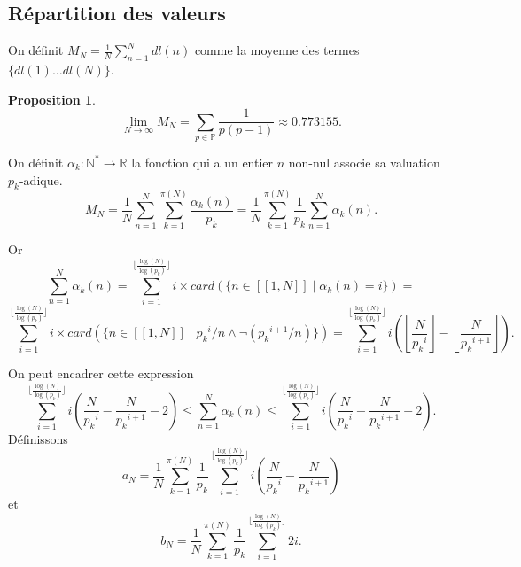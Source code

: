 \documentclass[a4paper, 12pt]{article}
\newcommand{\N}{\mathbb{N}}
\newcommand{\R}{\mathbb{R}}
\newcommand{\Pm}{\mathbb{P}}
\newcommand{\Prv}{\noindent{\it Preuve. }}
\newtheorem{prop}{Proposition}
\begin{document}

\subsection{Répartition des valeurs}

On définit $M_N = \frac{1}{N} \sum_{n=1}^{N} dl(n)$ comme la moyenne des termes $\{dl(1) \dots dl(N)\}$.

\begin{prop} \label{prop10} \begin{equation} \label{eq10}
\lim_{N \to \infty} M_N = \sum_{p \in \Pm}^{} \frac{1}{p(p-1)} \approx 0.773155. \end{equation} \end{prop}

\Prv
On définit $\alpha_k : \N^{*} \longrightarrow \R$ la fonction qui a un entier $n$ non-nul associe sa valuation $p_k$-adique.
\[M_N = \frac{1}{N} \sum_{n=1}^{N} \sum_{k=1}^{\pi(N)} \frac{\alpha_k(n)}{p_k} = \frac{1}{N} \sum_{k=1}^{\pi(N)} \frac{1}{p_k} \sum_{n=1}^{N} \alpha_k(n). \]

Or \[ \sum_{n=1}^{N} \alpha_k(n) =  \sum_{i=1}^{\lfloor \frac{\log(N)}{\log(p_k)} \rfloor} i \times card(\{n \in [\![1, N]\!] \mid \alpha_k(n)=i\}) = \]
\[ \sum_{i=1}^{\lfloor \frac{\log(N)}{\log(p_k)} \rfloor} i \times card(\{n \in [\![1, N]\!] \mid {p_k}^i / n \land \lnot({p_k}^{i+1} / n)\}) = \sum_{i=1}^{\lfloor \frac{\log(N)}{\log(p_k)} \rfloor} i \left(\left\lfloor \frac{N}{{p_k}^i} \right\rfloor - \left\lfloor \frac{N}{{p_k}^{i+1}} \right\rfloor \right).\]

On peut encadrer cette expression
\[\sum_{i=1}^{\lfloor \frac{\log(N)}{\log(p_k)} \rfloor} i \left(\frac{N}{{p_k}^i} -  \frac{N}{{p_k}^{i+1}} - 2 \right) \le \sum_{n=1}^{N} \alpha_k(n) \le \sum_{i=1}^{\lfloor \frac{\log(N)}{\log(p_k)} \rfloor} i \left(\frac{N}{{p_k}^i} -  \frac{N}{{p_k}^{i+1}} + 2 \right). \]
Définissons \[a_N = \frac{1}{N} \sum_{k=1}^{\pi(N)} \frac{1}{p_k} \sum_{i=1}^{\lfloor \frac{\log(N)}{\log(p_k)} \rfloor} i \left(\frac{N}{{p_k}^i} -  \frac{N}{{p_k}^{i+1}} \right) \]
et \[ b_N = \frac{1}{N} \sum_{k=1}^{\pi(N)} \frac{1}{p_k} \sum_{i=1}^{\lfloor \frac{\log(N)}{\log(p_k)} \rfloor} 2i. \]
\end{document}

